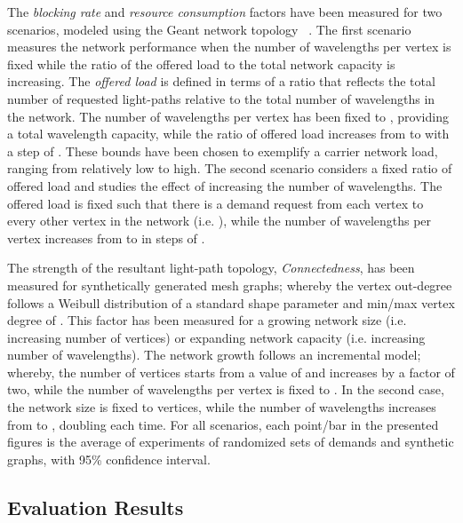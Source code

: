 \documentclass[journal]{IEEEtran}
\begin{document}
The \emph{blocking rate} and \emph{resource consumption} factors have been measured for two scenarios, modeled using the Geant network topology~\cite{kni:zoo} . 
The first scenario measures the network performance when the number of
wavelengths per vertex is fixed while the ratio of the offered load to
the total network capacity is increasing. The \emph{offered load} is
defined in terms of a ratio that reflects the total number of
requested light-paths relative to the total number of wavelengths in
the network. The number of wavelengths per vertex has been fixed to
, providing a  total wavelength capacity,
while the ratio of offered load increases from  to
 with a step of . These bounds have
been chosen to exemplify a carrier network load, ranging from
relatively low to high.
The second scenario considers a fixed ratio of offered load and
studies the effect of increasing the number of wavelengths. The
offered load is fixed such that there is a demand request from each
vertex to every other vertex in the network (i.e. ), while the number of wavelengths per vertex increases
from  to  in steps of .

The strength of the resultant light-path topology,
\emph{Connectedness}, has been measured for synthetically generated
mesh graphs; whereby the vertex out-degree follows a Weibull
distribution of a standard shape parameter  and min/max vertex
degree of . This factor has been measured for a growing network
size (i.e. increasing number of vertices) or expanding network
capacity (i.e. increasing number of wavelengths). The network growth
follows an incremental model; whereby, the number of vertices starts
from a value of  and increases by a factor of two, while the number
of wavelengths per vertex is fixed to . In the second case, the
network size is fixed to  vertices, while the number of
wavelengths increases from  to , doubling each time. For all scenarios, each point/bar in the presented figures is the average of  experiments of randomized sets of demands and synthetic graphs, with 95\% confidence interval.

\subsection{Evaluation Results}
\end{document}
